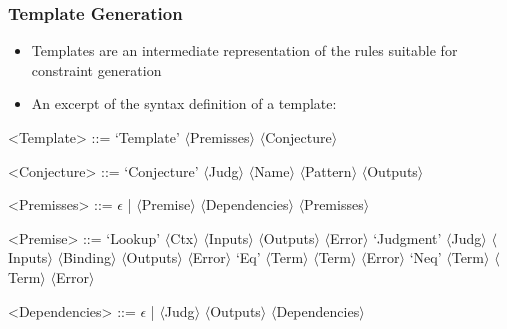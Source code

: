 \documentclass{beamer}
\begin{document}
\renewcommand*\selectTemplateGeneration{orange}
\renewcommand*\selectTemplateGeneration{}





\begin{frame}
  \frametitle{Template Generation}
  \begin{itemize}
  \item Templates are an intermediate representation of the rules
    suitable for constraint generation
  \item An excerpt of the syntax definition of a template:
  \end{itemize}

  \begin{grammar}
    <Template> ::= `Template' $\langle$Premisses$\rangle$ $\langle$Conjecture$\rangle$

    <Conjecture> ::= `Conjecture' $\langle$Judg$\rangle$ $\langle$Name$\rangle$ $\langle$Pattern$\rangle$ $\langle$Outputs$\rangle$

    <Premisses> ::= $\epsilon$ | $\langle$Premise$\rangle$ $\langle$Dependencies$\rangle$ $\langle$Premisses$\rangle$

    <Premise> ::= `Lookup' $\langle$Ctx$\rangle$ $\langle$Inputs$\rangle$ $\langle$Outputs$\rangle$ $\langle$Error$\rangle$
    \alt `Judgment' $\langle$Judg$\rangle$ $\langle$Inputs$\rangle$ $\langle$Binding$\rangle$ $\langle$Outputs$\rangle$ $\langle$Error$\rangle$
    \alt `Eq' $\langle$Term$\rangle$ $\langle$Term$\rangle$ $\langle$Error$\rangle$
    \alt `Neq' $\langle$Term$\rangle$ $\langle$Term$\rangle$ $\langle$Error$\rangle$

    <Dependencies> ::= $\epsilon$ | $\langle$Judg$\rangle$ $\langle$Outputs$\rangle$ $\langle$Dependencies$\rangle$
  \end{grammar}
\end{frame}
\end{document}
